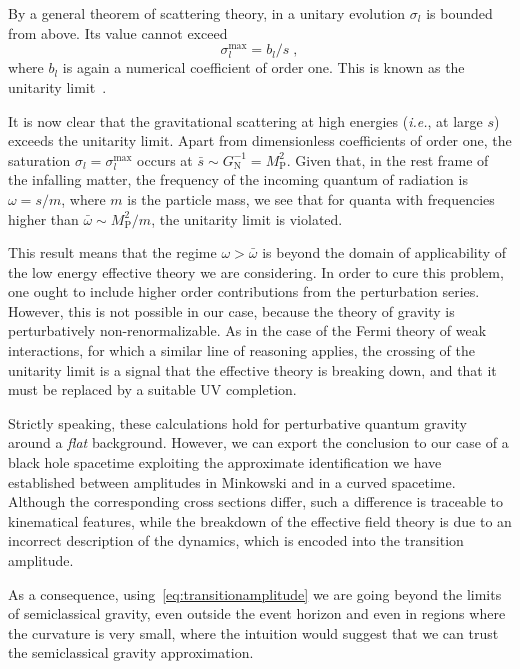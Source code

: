 \documentclass[prd,groupedaddress, showpacs, showkeys, onecolumn, nofootinbib, 12pt]{revtex4-2}
\def\ie{{\em i.e.\/}}%
\begin{document}
By a general theorem of scattering theory, in a unitary evolution $\sigma_l$ is bounded from above.  Its value cannot exceed
%
\begin{equation}
\sigma_l^\mathrm{max} = b_l/s\;,
\end{equation}
%
where $b_l$ is again a numerical coefficient of order one.  This is known as the unitarity limit~\cite{perkins}. 

It is now clear that the gravitational scattering at high energies (\ie,  at large $s$) exceeds the unitarity limit.  Apart from dimensionless coefficients of order one, the saturation $\sigma_l=\sigma^\mathrm{max}_l$ occurs at $\bar{s} \sim G_\mathrm{N}^{-1} =M_\mathrm{P}^{2}$.  Given that, in the rest frame of the infalling matter, the frequency of the incoming quantum of radiation is $\omega=s/m$, where $m$ is the particle mass, we see that for quanta with frequencies higher than $\bar{\omega} \sim M_\mathrm{P}^2/m$, the unitarity limit is violated.

This result means that the regime $\omega>\bar{\omega}$ is beyond the domain of applicability of the low energy effective theory we are considering.  In order to cure this problem, one ought to include higher order contributions from the perturbation series. However, this is not possible in our case, because the theory of gravity is perturbatively non-renormalizable.  As in the case of the Fermi theory of weak interactions, for which a similar line of reasoning applies, the crossing of the unitarity limit is a signal that the effective theory is breaking down, and that it must be replaced by a suitable UV completion. 

Strictly speaking, these calculations hold for perturbative quantum gravity around a {\em flat\/} background.  However, we can export the conclusion to our case of a black hole spacetime exploiting the approximate identification we have established between amplitudes in Minkowski and in a curved spacetime.  Although the  corresponding cross sections differ, such a difference is traceable to kinematical features, while the breakdown of the effective field theory is due to an incorrect description of the dynamics, which is encoded into the transition amplitude.

As a consequence, using~\eqref{eq:transitionamplitude} we are going beyond the limits of semiclassical gravity, even outside the event horizon and even in regions where the curvature is very small, where the intuition would suggest that we can trust the semiclassical gravity approximation. 
\end{document}
